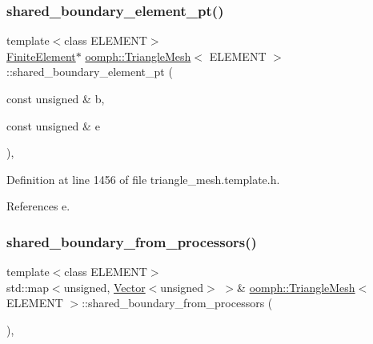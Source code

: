 \subsubsection{\texorpdfstring{shared\+\_\+boundary\+\_\+element\+\_\+pt()}{shared\_boundary\_element\_pt()}}
{\footnotesize\ttfamily template$<$class E\+L\+E\+M\+E\+NT$>$ \\
\hyperlink{classoomph_1_1FiniteElement}{Finite\+Element}$\ast$ \hyperlink{classoomph_1_1TriangleMesh}{oomph\+::\+Triangle\+Mesh}$<$ E\+L\+E\+M\+E\+NT $>$\+::shared\+\_\+boundary\+\_\+element\+\_\+pt (\begin{DoxyParamCaption}\item[{const unsigned \&}]{b,  }\item[{const unsigned \&}]{e }\end{DoxyParamCaption})\hspace{0.3cm}{\ttfamily [inline]}, {\ttfamily [protected]}}



Definition at line 1456 of file triangle\+\_\+mesh.\+template.\+h.



References e.

\mbox{\label{classoomph_1_1TriangleMesh_a10c5d3db04d6bd99b16485ff40a7bda2}} 
\subsubsection{\texorpdfstring{shared\+\_\+boundary\+\_\+from\+\_\+processors()}{shared\_boundary\_from\_processors()}\hspace{0.1cm}{\footnotesize\ttfamily [1/2]}}
{\footnotesize\ttfamily template$<$class E\+L\+E\+M\+E\+NT$>$ \\
std\+::map$<$unsigned, \hyperlink{classoomph_1_1Vector}{Vector}$<$unsigned$>$ $>$\& \hyperlink{classoomph_1_1TriangleMesh}{oomph\+::\+Triangle\+Mesh}$<$ E\+L\+E\+M\+E\+NT $>$\+::shared\+\_\+boundary\+\_\+from\+\_\+processors (\begin{DoxyParamCaption}{ }\end{DoxyParamCaption})\hspace{0.3cm}{\ttfamily [inline]}, {\ttfamily [protected]}}




